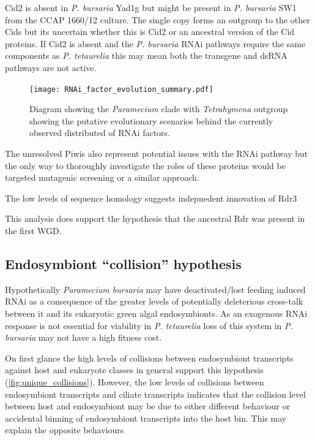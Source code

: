Cid2 is absent in \textit{P. bursaria} Yad1g but might be present in \textit{P. bursaria}
SW1 from the CCAP 1660/12 culture. The single copy forms an outgroup to the other
Cids but its uncertain whether this is Cid2 or an ancestral version of the 
Cid proteins.  
If Cid2 is absent and the \textit{P. bursaria} RNAi
pathways require the same components as \textit{P. tetaurelia} this may
mean both the transgene and dsRNA pathways are not active. 

\begin{figure}
    \texttt{[image: RNAi\_factor\_evolution\_summary.pdf]}
    \caption[Summary of RNAi Factors Evolutionary Scenarios in \textit{Paramecium} species]{
        Diagram showing the \textit{Paramecium} clade with \textit{Tetrahymena} outgroup 
        showing the putative evolutionary scenarios behind the currently
        observed distributed of RNAi factors.
    }
    \label{fig:rnai_evol_summary}
\end{figure}


The unresolved Piwis also represent potential issues with the RNAi pathway
but the only way to thoroughly investigate the roles of these proteins would
be targeted mutagenic screening or a similar approach.


The low levels of sequence homology suggests indepnedent innovation 
of Rdr3



This analysis does support the hypothesis that the ancestral Rdr \citep{Marker2014}
was present in the first WGD. 


\subsection{Endosymbiont ``collision'' hypothesis}

Hypothetically \textit{Paramecium bursaria}
may have deactivated/lost feeding induced RNAi as a consequence
of the greater levels of potentially deleterious cross-talk between
it and its eukaryotic green algal endosymbionts.  
As an exogenous RNAi response is not essential 
for viability in \textit{P. tetaurelia} \citep{Marker2014} loss
of this system in \textit{P. bursaria} may not have a high fitness cost.


On first glance the high levels of collisions between endosymbiont
transcripts against host and eukaryote classes in general support this
hypothesis (\cref{fig:unique_collisions}).
However, the low levels of collisions between endosymbiont transcripts
and ciliate transcripts indicates that the collision level
between host and endosymbiont may be due to either
different behaviour or accidental binning of endosymbiont
transcripts into the host bin. This may explain the opposite behaviours



